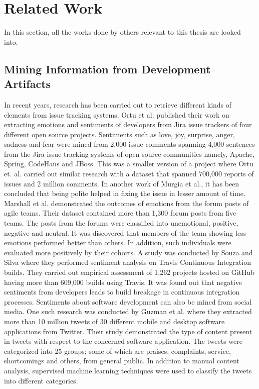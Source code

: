 \documentclass[a4paper,12pt,twoside]{report}
\begin{document}
\section{Related Work}

In this section, all the works done by others relevant to this thesis are looked into. 

\subsection{Mining Information from Development Artifacts}
In recent years, research has been carried out to retrieve different kinds of elements from issue tracking systems. Ortu et al.\cite{Ortu2017} published their work on extracting emotions and sentiments of developers from Jira issue trackers of four different open source projects.  Sentiments such as love, joy, surprise, anger, sadness and fear were mined from 2,000 issue comments spanning 4,000 sentences from the Jira issue tracking systems of open source communities namely, Apache, Spring, CodeHaus and JBoss. This was a smaller version of a project where Ortu et. al.\cite{Ortu2015} carried out similar research with a dataset that spanned 700,000 reports of issues and 2 million comments. In another work of Murgia et al.\cite{Murgia2014}, it has been concluded that being polite helped in fixing the issue in lesser amount of time. 
\newline \newline
Marshall et al.\cite{Marshall2016} demonstrated the outcomes of emotions from the forum posts of agile teams. Their dataset contained more than 1,300 forum posts from five teams. The posts from the forums were classified into unemotional, positive, negative and neutral. It was discovered that members of the team showing less emotions performed better than others. In addition, such individuals were evaluated more positively by their cohorts. 
\newline \newline
A study was conducted by Souza and Silva \cite{Souza2017} where they performed sentiment analysis on Travis Continuous Integration builds. They carried out empirical assessment of 1,262 projects hosted on GitHub having more than 609,000 builds using Travis. It was found out that negative sentiments from developers leads to build breakage in continuous integration processes. 
\newline \newline
Sentiments about software development can also be mined from social media. One such research was conducted by Guzman et al.\cite{Guzman2017} where they extracted more than 10 million tweets of 30 different mobile and desktop software applications from Twitter. Their study demonstrated the type of content present in tweets with respect to the concerned software application. The tweets were categorized into 25 groups; some of which are praises, complaints, service, shortcomings and others, from general public. In addition to manual content analysis, supervised machine learning techniques were used to classify the tweets into different categories. 
\end{document}
